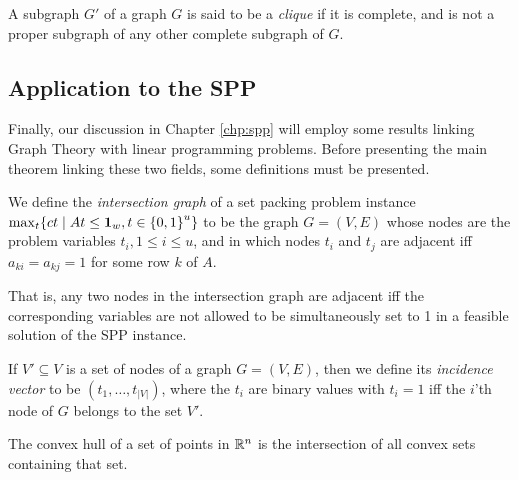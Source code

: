 \begin{definition}[Clique]
    \label{def:clique}
    
    A subgraph $G'$ of a graph $G$ is said to be a \emph{clique} if it is
    complete, and is not a proper subgraph of any other complete subgraph of
    $G$.
\end{definition}

\subsection{Application to the SPP}

Finally, our discussion in Chapter \ref{chp:spp} will employ some results
linking Graph Theory with linear programming problems. Before presenting the
main theorem linking these two fields, some definitions must be presented.

\begin{definition}
    \label{def:intersection-graph}
    
    We define the \emph{intersection graph} of a set packing
    problem instance
    $
        \max_t \{ ct \mid At \leq \textbf{1}_w, t \in {\ensuremath{\{ 0, 1 \}}}^u \}
    $
    to be the graph $G = (V, E)$ whose nodes are the problem variables $t_i, 1
    \leq i \leq u$, and in which nodes $t_i$ and $t_j$ are adjacent iff $a_{ki}
    = a_{kj} = 1$ for some row $k$ of $A$.
\end{definition}

That is, any two nodes in the intersection graph are adjacent iff the
corresponding variables are not allowed to be simultaneously set to 1 in a
feasible solution of the SPP instance.

\begin{definition}
    \label{def:incidence-vector}
    
    If $V' \subseteq V$ is a set of nodes of a graph $G = (V, E)$, then we
    define its \emph{incidence vector} to be $(t_1, \ldots, t_{|V|})$, where the
    $t_i$ are binary values with $t_i = 1$ iff the $i$'th node of $G$ belongs to
    the set $V'$.
\end{definition}

\begin{definition}
    \label{def:convex-hull}

    The convex hull of a set of points in ${\mathbb{R}}^n$ is the intersection of all
    convex sets containing that set.
\end{definition}

